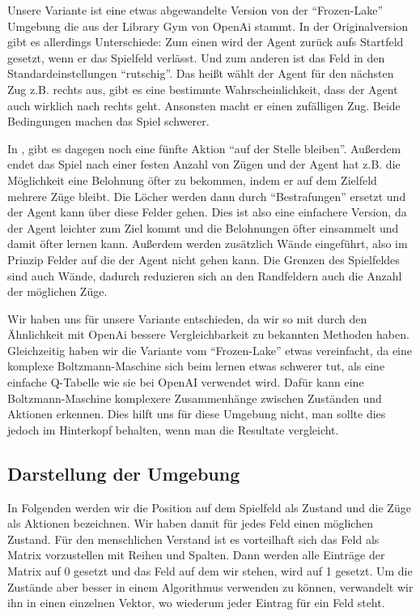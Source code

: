 Unsere Variante ist eine etwas abgewandelte Version von der ``Frozen-Lake'' Umgebung die aus der Library Gym von OpenAi stammt. In der Originalversion gibt es allerdings Unterschiede: Zum einen wird der Agent zurück aufs Startfeld gesetzt, wenn er das Spielfeld verlässt. Und zum anderen ist das Feld in den Standardeinstellungen ``rutschig''. Das heißt wählt der Agent für den nächsten Zug z.B. rechts aus, gibt es eine bestimmte Wahrscheinlichkeit, dass der Agent auch wirklich nach rechts geht. Ansonsten macht er einen zufälligen Zug. Beide Bedingungen machen das Spiel schwerer.

In \citep{crawford2019reinforcement}, gibt es dagegen noch eine fünfte Aktion ``auf der Stelle bleiben''. Außerdem endet das Spiel nach einer festen Anzahl von Zügen und der Agent hat z.B. die Möglichkeit eine Belohnung öfter zu bekommen, indem er auf dem Zielfeld mehrere Züge bleibt. Die Löcher werden dann durch ``Bestrafungen'' ersetzt und der Agent kann über diese Felder gehen. Dies ist also eine einfachere Version, da der Agent leichter zum Ziel kommt und die Belohnungen öfter einsammelt und damit öfter lernen kann. Außerdem werden zusätzlich Wände eingeführt, also im Prinzip Felder auf die der Agent nicht gehen kann. Die Grenzen des Spielfeldes sind auch Wände, dadurch reduzieren sich an den Randfeldern auch die Anzahl der möglichen Züge.

Wir haben uns für unsere Variante entschieden, da wir so mit durch den Ähnlichkeit mit OpenAi bessere Vergleichbarkeit zu bekannten Methoden haben. Gleichzeitig haben wir die Variante vom ``Frozen-Lake'' etwas vereinfacht, da eine komplexe Boltzmann-Maschine sich beim lernen etwas schwerer tut, als eine einfache Q-Tabelle wie sie bei OpenAI verwendet wird. Dafür kann eine Boltzmann-Maschine komplexere Zusammenhänge zwischen Zuständen und Aktionen erkennen. Dies hilft uns für diese Umgebung nicht, man sollte dies jedoch im Hinterkopf behalten, wenn man die Resultate vergleicht.

\subsection{Darstellung der Umgebung}
\label{subsec:darstellung}

In Folgenden werden wir die Position auf dem Spielfeld als Zustand und die Züge als Aktionen bezeichnen. Wir haben damit für jedes Feld einen möglichen Zustand. Für den menschlichen Verstand ist es vorteilhaft sich das Feld als Matrix vorzustellen mit Reihen und Spalten. Dann werden alle Einträge der Matrix auf 0 gesetzt und das Feld auf dem wir stehen, wird auf 1 gesetzt. Um die Zustände aber besser in einem Algorithmus verwenden zu können, verwandelt wir ihn in einen einzelnen Vektor, wo wiederum jeder Eintrag für ein Feld steht.

